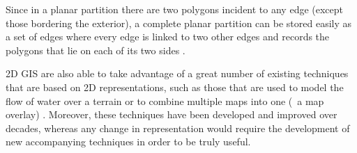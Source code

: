 Since in a planar partition there are two polygons incident to any edge (except those bordering the exterior), a complete planar partition can be stored easily as a set of edges where every edge is linked to two other edges and records the polygons that lie on each of its two sides \citep{Peucker75}.


2D GIS are also able to take advantage of a great number of existing techniques that are based on 2D representations, such as those that are used to model the flow of water over a terrain \citep{vanKreveld97} or to combine multiple maps into one (\ie\ a map overlay) \citep[\S{}2.3]{deBerg08}.
Moreover, these techniques have been developed and improved over decades, whereas any change in representation would require the development of new accompanying techniques in order to be truly useful.


